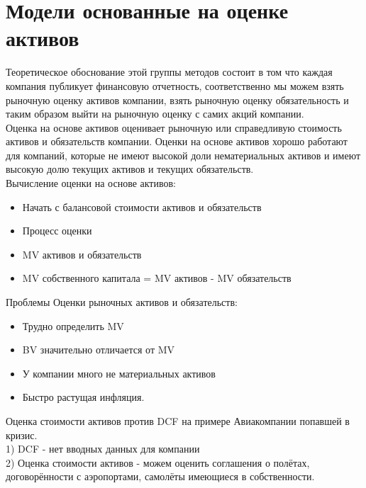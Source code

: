 \documentclass{article}
\begin{document}
\section{Модели основанные на оценке активов}
Теоретическое обоснование этой группы методов состоит в том что каждая компания публикует финансовую отчетность, соответственно мы можем взять рыночную оценку активов компании, взять рыночную оценку обязательность и таким образом выйти на рыночную оценку с самих акций компании.\\
Оценка на основе активов оценивает рыночную или справедливую стоимость активов и обязательств компании.
Оценки на основе активов хорошо работают для компаний, которые не имеют высокой доли нематериальных активов и имеют высокую долю текущих активов и текущих обязательств.\\
Вычисление оценки на основе активов:\\
\begin{itemize}
    \item Начать с балансовой стоимости активов и обязательств
    \item Процесс оценки
    \item MV активов и обязательств
    \item MV собственного капитала = MV активов - MV обязательств
\end{itemize}

Проблемы Оценки рыночных активов и обязательств:
\begin{itemize}
    \item Трудно определить MV
    \item BV значительно отличается от MV
    \item У компании много не материальных активов
    \item Быстро растущая инфляция.
\end{itemize}
Оценка стоимости активов против DCF на примере Авиакомпании попавшей в кризис.\\

1) DCF - нет вводных данных для компании\\
2) Оценка стоимости активов - можем оценить соглашения о полётах, договорённости с аэропортами, самолёты имеющиеся в собственности.
\end{document}
